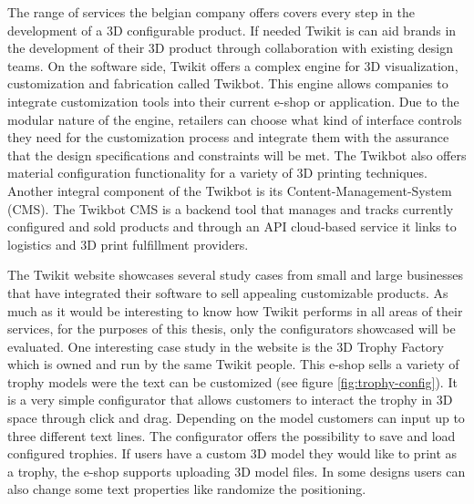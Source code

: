 \documentclass[../medieninformatik-arbeit.tex]{subfiles}
\begin{document}
The range of services the belgian company offers covers every step in the development of a 3D configurable product. If needed Twikit is can aid brands in the development of their 3D product through collaboration with existing design teams. On the software side, Twikit offers a complex engine for 3D visualization, customization and fabrication called Twikbot. This engine allows companies to integrate customization tools into their current e-shop or application. Due to the modular nature of the engine, retailers can choose what kind of interface controls they need for the customization process and integrate them with the assurance that the design specifications and constraints will be met. The Twikbot also offers material configuration functionality for a variety of 3D printing techniques. Another integral component of the Twikbot is its Content-Management-System (CMS). The Twikbot CMS is a backend tool that manages and tracks currently configured and sold products and through an API cloud-based service it links to logistics and 3D print fulfillment providers. 

The Twikit website showcases several study cases from small and large businesses that have integrated their software to sell appealing customizable products. As much as it would be interesting to know how Twikit performs in all areas of their services, for the purposes of this thesis, only the configurators showcased will be evaluated. One interesting case study in the website is the 3D Trophy Factory\cite{twikit2015tech} which is owned and run by the same Twikit people. This e-shop sells a variety of trophy models were the text can be customized (see figure \ref{fig:trophy-config}). It is a very simple configurator that allows customers to interact the trophy in 3D space through click and drag. Depending on the model customers can input up to three different text lines. The configurator offers the possibility to save and load configured trophies. If users have a custom 3D model they would like to print as a trophy, the e-shop supports uploading 3D model files. In some designs users can also change some text properties like randomize the positioning. 
\end{document}
